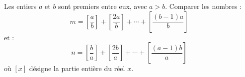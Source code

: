 Les entiers $a$ et $b$ sont premiers entre eux, avec $a > b$. Comparer les nombres :
\[
m = \left[\frac{a}{b}\right] + \left[\frac{2a}{b}\right] + \cdots + \left[\frac{(b-1)a}{b}\right]
\]
et :
\[
n = \left[\frac{b}{a}\right] + \left[\frac{2b}{a}\right] + \cdots + \left[\frac{(a-1)b}{a}\right]
\]
où $[x]$ désigne la partie entière du réel $x$.
